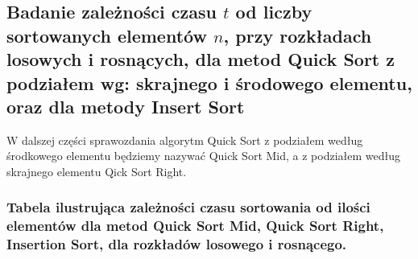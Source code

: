 \documentclass[polish,polish,a4paper]{article}
\begin{document}
\begin{spacing}{1.5}
\section{Badanie zależności czasu $t$ od liczby sortowanych elementów $n$, przy rozkładach losowych i rosnących, dla metod Quick Sort z podziałem wg: skrajnego i środowego elementu, oraz dla metody Insert Sort}

W dalszej części sprawozdania algorytm Quick Sort z podziałem według środkowego elementu będziemy nazywać Quick Sort Mid, a z podziałem według skrajnego elementu Qick Sort Right.


	\subsubsection*{Tabela ilustrująca zależności czasu sortowania od ilości elementów dla metod Quick Sort Mid, Quick Sort Right, Insertion Sort, dla rozkładów losowego i rosnącego.}


\begin{figure}[H]
	\begin{equation*}
	\begin{array}{l|c|c|c|c|c|c|}
	

\end{array}
\end{equation*}
\end{figure}
\end{spacing}
\end{document}
